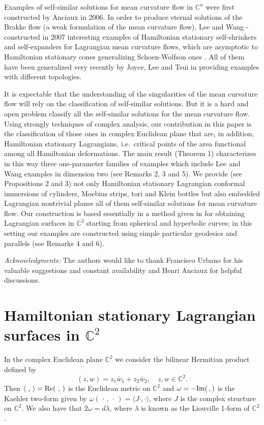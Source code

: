 \documentclass[leqno,11pt]{amsart}
\begin{document}
Examples of self-similar solutions for mean curvature flow in
${\mathbb{C}}^n$ were first constructed by Anciaux \cite{A} in 2006. In
order to produce eternal solutions of the Brakke flow (a weak
formulation of the mean curvature flow), Lee and Wang
\cite{LW1}-\cite{LW2} constructed in 2007 interesting examples of
Hamiltonian stationary self-shrinkers and self-expanders for
Lagrangian mean curvature flows, which are asymptotic to
Hamiltonian stationary cones generalizing Schoen-Wolfson ones
\cite{SW}. All of them have been generalized very recently by
Joyce, Lee and Tsui in \cite{JLT} providing examples with
different topologies.

It is expectable that the understanding of the singularities of
the mean curvature flow will rely on the classification of
self-similar solutions. But it is a hard and open problem classify
all the self-similar solutions for the mean curvature flow.  Using
strongly techniques of complex analysis, our contribution in this
paper is the classification of those ones in complex Euclidean
plane that are, in addition, Hamiltonian stationary Lagrangians,
i.e.\ critical points of the area functional among all Hamiltonian
deformations. The main result (Theorem 1) characterizes in this
way three one-parameter families of examples which include Lee and
Wang examples in dimension two (see Remarks 2, 3 and 5). We
provide (see Propositions 2 and 3) not only Hamiltonian stationary
Lagrangian conformal immersions of cylinders, Moebius strips, tori
and Klein bottles but also embedded Lagrangian nontrivial planes
all of them self-similar solutions for mean curvature flow. Our
construction is based essentially in a method given in \cite{CCh}
for obtaining Lagrangian surfaces in ${\mathbb{C}}^2$ starting from
spherical and hyperbolic curves; in this setting our examples are
constructed using simple particular geodesics and parallels (see
Remarks 4 and 6).

{\it Acknowledgments:} The authors would like to thank  Francisco
Urbano for his valuable suggestions and constant availability and
Henri Anciaux for helpful discussions.

\section{Hamiltonian stationary Lagrangian surfaces in ${\mathbb{C}}^2$}

In the complex Euclidean plane ${\mathbb{C}}^2$ we consider the bilinear Hermitian product defined by
\[
(z,w)=z_1\bar{w}_1+z_2\bar{w}_2, \quad  z,w\in{\mathbb{C}}^2.
\]
Then $\langle\, \, , \, \rangle = {\rm Re} (\,\, , \,)$ is the
Euclidean metric on ${\mathbb{C}}^2$ and $\omega = -{\rm Im} (\,,)$ is the
Kaehler two-form given by $\omega (\,\cdot\, ,\,\cdot\,)=\langle
J\cdot,\cdot\rangle$, where $J$ is the complex structure on
${\mathbb{C}}^2$. We also have that $2 \omega = d\lambda$, where $\lambda$
is known as the Liouville 1-form of ${\mathbb{C}}^2$.
\end{document}
